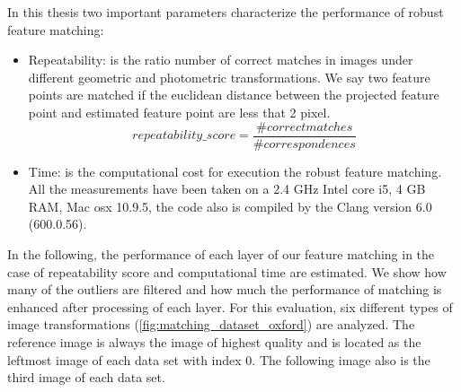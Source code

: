 In this thesis two important parameters characterize the performance of robust feature matching:
\begin{itemize}
  \item Repeatability: is the ratio number of correct matches in images under different geometric and photometric transformations. We say two feature points are matched if the euclidean distance between the projected feature point and estimated feature point are less that 2 pixel.\\
  $$repeatability\_score = \frac{\# correct matches}{\# correspondences}$$
  \item Time: is the computational cost for execution the robust feature matching. All the measurements have been taken on a 2.4 GHz Intel core i5, 4 GB RAM, Mac osx 10.9.5, the code also is compiled by the Clang version 6.0 (600.0.56).
\end{itemize}

In the following, the performance of each layer of our feature matching in the case of repeatability score and computational time are estimated. We show how many of the outliers are filtered and how much the performance of matching is enhanced after processing of each layer. For this evaluation, six different types of image transformations (\autoref{fig:matching_dataset_oxford}) are analyzed. The reference image is always the image of highest quality and is located as the leftmost image of each data set with index 0. The following image also is the third image of each data set.

